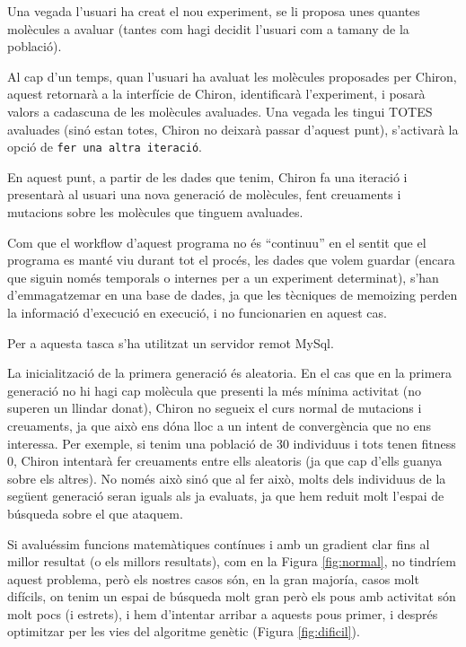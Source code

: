 Una vegada l'usuari ha creat el nou experiment, se li proposa unes quantes
molècules a avaluar (tantes com hagi decidit l'usuari com a tamany de la
població).

Al cap d'un temps, quan l'usuari ha avaluat les molècules proposades per Chiron,
aquest retornarà a la interfície de Chiron, identificarà l'experiment, i posarà
valors a cadascuna de les molècules avaluades.  Una vegada les tingui TOTES
avaluades (sinó estan totes, Chiron no deixarà passar d'aquest punt), s'activarà
la opció de \texttt{fer una altra iteració}.  

En aquest punt, a partir de les dades que tenim, Chiron fa una iteració i
presentarà al usuari una nova generació de molècules, fent creuaments i
mutacions sobre les molècules que tinguem avaluades.

Com que el workflow d'aquest programa no és ``continuu'' en el sentit que el
programa es manté viu durant tot el procés, les dades que volem guardar (encara
que siguin només temporals o internes per a un experiment determinat), s'han
d'emmagatzemar en una base de dades, ja que les tècniques de memoizing %
perden la informació d'execució en execució, i no funcionarien en aquest cas.

Per a aquesta tasca s'ha utilitzat un servidor remot MySql.

La inicialització de la primera generació és aleatoria. En el cas que en la
primera generació no hi hagi cap molècula que presenti la més mínima activitat
(no superen un llindar donat), Chiron no segueix el curs normal de mutacions i
creuaments, ja que això ens dóna lloc a un intent de convergència que no ens
interessa.  Per exemple, si tenim una població de 30 individuus i tots tenen
fitness 0, Chiron intentarà fer creuaments entre ells aleatoris (ja que cap
d'ells guanya sobre els altres).  No només això sinó que al fer això, molts dels
individuus de la següent generació seran iguals als ja evaluats, ja que hem
reduit molt l'espai de búsqueda sobre el que ataquem.

Si avaluéssim funcions matemàtiques contínues i amb un gradient clar fins al
millor resultat (o els millors resultats), com en la Figura \ref{fig:normal}, no
tindríem aquest problema, però els nostres casos són, en la gran majoría, casos
molt difícils, on tenim un espai de búsqueda molt gran però els pous amb
activitat són molt pocs (i estrets), i hem d'intentar arribar a aquests pous
primer, i després optimitzar per les vies del algoritme genètic (Figura
\ref{fig:dificil}).

